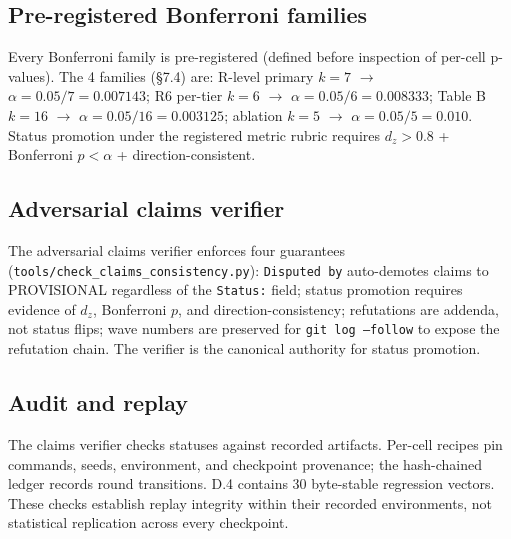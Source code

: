 \documentclass[journal,twocolumn,final]{IEEEtran}
\begin{document}
\subsection{Pre-registered Bonferroni families}

Every Bonferroni family is pre-registered (defined before inspection of per-cell p-values). The 4 families (\S7.4) are: R-level primary $k = 7$ \ensuremath{\to} $\alpha = 0.05/7 = 0.007143$; R6 per-tier $k = 6$ \ensuremath{\to} $\alpha = 0.05/6 = 0.008333$; Table B $k = 16$ \ensuremath{\to} $\alpha = 0.05/16 = 0.003125$; ablation $k = 5$ \ensuremath{\to} $\alpha = 0.05/5 = 0.010$. Status promotion under the registered metric rubric requires $d_z > 0.8$ + Bonferroni $p < \alpha$ + direction-consistent.

\subsection{Adversarial claims verifier}

The adversarial claims verifier enforces four guarantees (\texttt{tools/\allowbreak check\_claims\_\allowbreak consistency.py}): \texttt{Disputed by} auto-demotes claims to PROVISIONAL regardless of the \texttt{Status:} field; status promotion requires evidence of $d_z$, Bonferroni $p$, and direction-consistency; refutations are addenda, not status flips; wave numbers are preserved for \texttt{git log --follow} to expose the refutation chain. The verifier is the canonical authority for status promotion.

\subsection{Audit and replay}
The claims verifier checks statuses against recorded artifacts. Per-cell recipes pin commands, seeds, environment, and checkpoint provenance; the hash-chained ledger records round transitions. D.4 contains 30 byte-stable regression vectors. These checks establish replay integrity within their recorded environments, not statistical replication across every checkpoint.
\end{document}
